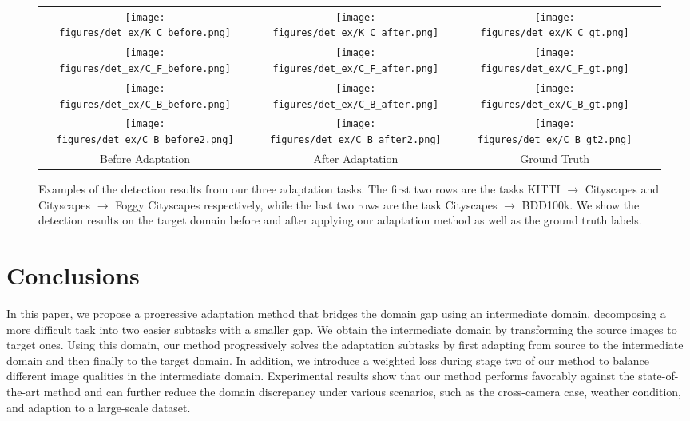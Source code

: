 \documentclass[10pt,twocolumn,letterpaper]{article}
\begin{document}
\begin{figure*}[t]
\centering
\begin{tabular}{c@{\hspace{0.005\linewidth}}c@{\hspace{0.005\linewidth}}c@{\hspace{0.005\linewidth}}c}

\texttt{[image: figures/det\_ex/K\_C\_before.png]} & 
\texttt{[image: figures/det\_ex/K\_C\_after.png]} &
\texttt{[image: figures/det\_ex/K\_C\_gt.png]} &\\

\texttt{[image: figures/det\_ex/C\_F\_before.png]} & 
\texttt{[image: figures/det\_ex/C\_F\_after.png]} &
\texttt{[image: figures/det\_ex/C\_F\_gt.png]} &\\

\texttt{[image: figures/det\_ex/C\_B\_before.png]} & 
\texttt{[image: figures/det\_ex/C\_B\_after.png]} &
\texttt{[image: figures/det\_ex/C\_B\_gt.png]} &\\

\texttt{[image: figures/det\_ex/C\_B\_before2.png]} & 
\texttt{[image: figures/det\_ex/C\_B\_after2.png]} &
\texttt{[image: figures/det\_ex/C\_B\_gt2.png]} &\\
{Before Adaptation} & {After Adaptation} & {Ground Truth} & \\
\end{tabular}
\vspace{0.05em}
\caption{
Examples of the detection results from our three adaptation tasks.
The first two rows are the tasks KITTI $\rightarrow$ Cityscapes and Cityscapes $\rightarrow$ Foggy Cityscapes respectively, while the last two rows are the task Cityscapes $\rightarrow$ BDD100k.
We show the detection results on the target domain before and after applying our adaptation method as well as the ground truth labels.
}
\label{fig:det_ex}
\end{figure*}
\vspace{-1mm}
\section{Conclusions}
In this paper, we propose a progressive adaptation method that bridges the domain gap using an intermediate domain, decomposing a more difficult task into two easier subtasks with a smaller gap.
We obtain the intermediate domain by transforming the source images to target ones.
Using this domain, our method progressively solves the adaptation subtasks by first adapting from source to the intermediate domain and then finally to the target domain.
In addition, we introduce a weighted loss during stage two of our method to balance different image qualities in the intermediate domain.
Experimental results show that our method performs favorably against the state-of-the-art method and can further reduce the domain discrepancy under various scenarios, such as the cross-camera case, weather condition, and adaption to a large-scale dataset.
\end{document}
